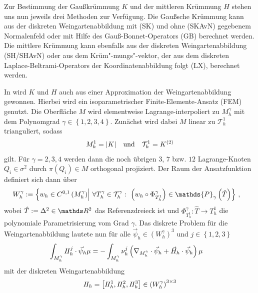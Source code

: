   Zur Bestimmung der Gaußkrümmung \( K \) und der mittleren Krümmung \( H \) stehen uns nun jeweils drei Methoden zur Verfügung.
  Die Gaußsche Krümmung kann aus der diskreten Weingartenabbildung mit (SK) und ohne (SKAvN) gegebenem Normalenfeld 
  oder mit Hilfe des Gauß-Bonnet-Operators (GB) berechnet werden.
  Die mittlere Krümmung kann ebenfalls aus der diskreten Weingartenabbildung (SH/SHAvN) oder aus dem Krüm"-mungs"-vektor, der aus dem diskreten Laplace-Beltrami-Operators der Koordinatenabbildung
  folgt (LX), berechnet werden.

  In \cite{heine} wird \( K \) und \( H \) auch aus einer Approximation der Weingartenabbildung gewonnen.
  Hierbei wird ein isoparametrischer Finite-Elemente-Ansatz (FEM) genutzt. 
  Die Oberfläche \( M \) wird elementweise Lagrange-interpoliert zu \( M^{\gamma}_{h} \) mit dem Polynomgrad \( \gamma\in\left\{ 1,2,3,4 \right\} \).
  Zunächst wird dabei \( M \) linear zu \(\mathcal{T}^{1}_{h}  \) trianguliert, sodass
  \begin{align}
     M_{h}^{1} = |K|  \quad\text{und}\quad
     \mathcal{T}^{1}_{h} = K^{(2)}
  \end{align}
  gilt.
  Für \( \gamma = 2,3,4 \) werden dann die noch übrigen \( 3 \), \( 7 \) bzw. \( 12 \) Lagrange-Knoten \( Q_{i}\in\sigma^{2} \) durch \( \pi\left( Q_{i} \right)\in M \) orthogonal projiziert.
  Der Raum der Ansatzfunktion definiert sich dann über
  \begin{align}
    W_{h}^{\gamma} 
      &:= \left\{ w_{h}\in C^{0,1}\left( M_{h}^{\gamma} \right) \middle|\  
                          \forall T_{h}^{\gamma} \in \mathcal{T}_{h}^{\gamma}:\  \left( w_{h} \circ \Phi_{T_{h}^{1}}^{\gamma}\right) \in \mathds{P}_{\gamma}\left(\hat{T}\right)\right\}
                          \formkomma
  \end{align}
  wobei \( \hat{T}:=\Delta^{2}\in\R^{2} \) das Referenzdreieck ist und 
  \( \Phi_{T_{h}^{1}}^{\gamma}: \hat{T} \rightarrow T_{h}^{1} \)
  die polynomiale Parametrisierung vom Grad \( \gamma \).
  Das diskrete Problem für die Weingartenabbildung lautete nun für alle \( \vec{\psi}_{h}\in \left( W_{h}^{\gamma} \right)^{3} \)
  und \( j\in\left\{ 1,2,3 \right\} \)
  \begin{align}
    \int_{M_{h}^{\gamma}} I \! I_{h}^{j} \cdot \vec{\psi}_{h} \mu
        &= -\int_{M_{h}^{\gamma}} \nu_{h}^{j} \left( \nabla_{M_{h}^{\gamma}} \cdot \vec{\psi}_{h} + \vec{H}_{h}\cdot\vec{\psi}_{h} \right) \mu
  \end{align}
  mit der diskreten Weingartenabbildung 
  \begin{align}
    I \! I_{h} = \left[ I \! I_{h}^{1}, I \! I_{h}^{2}, I \! I_{h}^{3} \right] \in \left( W_{h}^{\gamma} \right)^{3 \times 3}
  \end{align}
